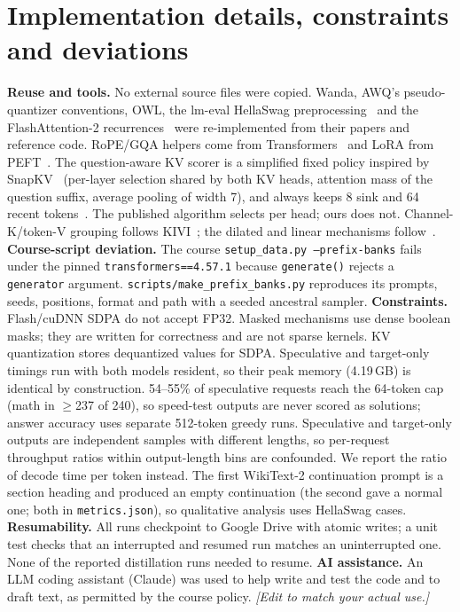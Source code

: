\documentclass{article}
\begin{document}
\section{Implementation details, constraints and deviations}\label{app:impl}
\textbf{Reuse and tools.} No external source files were copied. Wanda, AWQ's pseudo-quantizer conventions, OWL, the lm-eval HellaSwag preprocessing~\cite{lmeval} and the FlashAttention-2 recurrences~\cite{flash,flash2} were re-implemented from their papers and reference code. RoPE/GQA helpers come from Transformers~\cite{hf} and LoRA from PEFT~\cite{peft}. The question-aware KV scorer is a simplified fixed policy inspired by SnapKV~\cite{snapkv} (per-layer selection shared by both KV heads, attention mass of the question suffix, average pooling of width 7), and always keeps 8 sink and 64 recent tokens~\cite{streaming}. The published algorithm selects per head; ours does not. Channel-K/token-V grouping follows KIVI~\cite{kivi}; the dilated and linear mechanisms follow~\cite{longformer,linear,zoology,based}.
\textbf{Course-script deviation.} The course \texttt{setup\_data.py --prefix-banks} fails under the pinned \texttt{transformers==4.57.1} because \texttt{generate()} rejects a \texttt{generator} argument. \texttt{scripts/make\_prefix\_banks.py} reproduces its prompts, seeds, positions, format and path with a seeded ancestral sampler.
\textbf{Constraints.} Flash/cuDNN SDPA do not accept FP32. Masked mechanisms use dense boolean masks; they are written for correctness and are not sparse kernels. KV quantization stores dequantized values for SDPA. Speculative and target-only timings run with both models resident, so their peak memory (4.19\,GB) is identical by construction. 54--55\% of speculative requests reach the 64-token cap (math in $\ge$237 of 240), so speed-test outputs are never scored as solutions; answer accuracy uses separate 512-token greedy runs. Speculative and target-only outputs are independent samples with different lengths, so per-request throughput ratios within output-length bins are confounded. We report the ratio of decode time per token instead. The first WikiText-2 continuation prompt is a section heading and produced an empty continuation (the second gave a normal one; both in \texttt{metrics.json}), so qualitative analysis uses HellaSwag cases.
\textbf{Resumability.} All runs checkpoint to Google Drive with atomic writes; a unit test checks that an interrupted and resumed run matches an uninterrupted one. None of the reported distillation runs needed to resume.
\textbf{AI assistance.} An LLM coding assistant (Claude) was used to help write and test the code and to draft text, as permitted by the course policy. \textit{[Edit to match your actual use.]}
\end{document}
